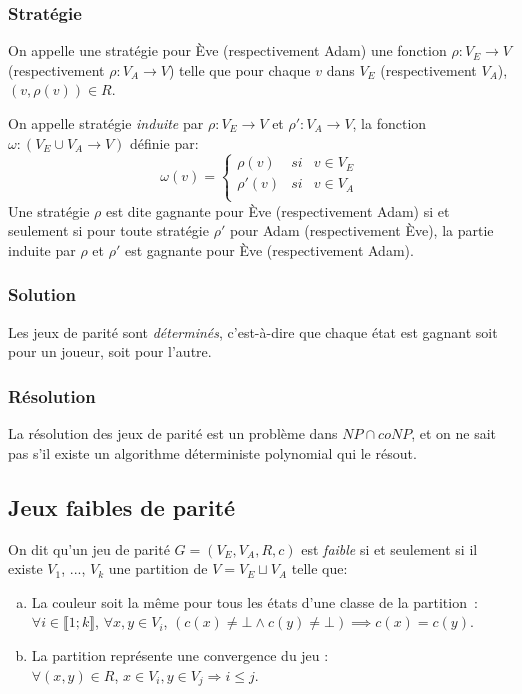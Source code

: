 \documentclass[10pt,a4paper]{article}
\begin{document}
\subsubsection{Stratégie}
On appelle une stratégie pour Ève (respectivement Adam) une fonction $\rho : V_E \to V$ (respectivement $\rho : V_A \to V$) telle que pour chaque $v$ dans $V_E$ (respectivement $V_A$), $(v, \rho(v)) \in R$.

On appelle stratégie \emph{induite} par $\rho : V_E \to V$ et $\rho' : V_A \to V$, la fonction $\omega : (V_E \cup V_A \to V)$ définie par:
\\
$$\omega(v) = \left \{
\begin{array}{rcl}
\rho(v) & si & v \in V_E\\
\rho'(v) & si & v \in V_A\\
\end{array}
\right .$$
Une stratégie $\rho$ est dite gagnante pour Ève (respectivement Adam) si et seulement si pour toute stratégie $\rho'$ pour Adam (respectivement Ève), la partie induite par $\rho$ et $\rho'$ est gagnante pour Ève (respectivement Adam).

\subsubsection{Solution}
Les jeux de parité sont \emph{déterminés}, c'est-à-dire que chaque état est gagnant soit pour un joueur, soit pour l'autre.

\subsubsection{Résolution}
La résolution des jeux de parité est un problème dans $NP \cap coNP$, et on ne sait pas s'il existe un algorithme déterministe polynomial qui le résout.

\subsection{Jeux faibles de parité}
\label{fpg}

On dit qu'un jeu de parité $G = (V_E,V_A,R,c)$ est \emph{faible}  si et seulement si il existe $V_1$, ..., $V_k$ une partition de $V = V_E \sqcup V_A$ telle que:
\begin{enumerate}[a)]
\item La couleur soit la même pour tous les états d'une classe de la partition : $\forall i \in \llbracket 1 ; k \rrbracket$, $\forall x, y \in V_i$, $(c(x) \neq \bot \land c(y) \neq \bot)  \implies c(x) = c(y)$.
\item La partition représente une convergence du jeu :\\
$\forall (x, y) \in R$, $x\in V_i, y \in V_j \Rightarrow i \leq j$.
\end{enumerate}
\end{document}
